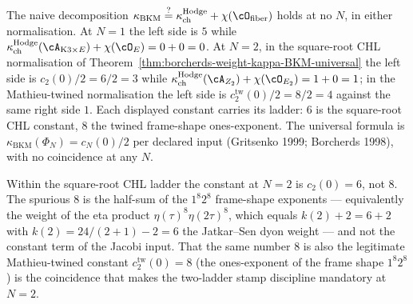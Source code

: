 \begin{remark}
\label{rem:kbkm-additive-failure-per-ladder}
The naive decomposition
$\kappa_{\mathrm{BKM}} \stackrel{?}{=}
\kappa_{\mathrm{ch}}^{\mathrm{Hodge}} + \chi(\cO_{\mathrm{fiber}})$
holds at no $N$, in either normalisation. At $N = 1$ the left side is
$5$ while $\kappa_{\mathrm{ch}}^{\mathrm{Hodge}}(\cA_{\mathrm{K3}\times E}) +
\chi(\cO_E) = 0 + 0 = 0$. At $N = 2$, in the square-root CHL
normalisation of
Theorem~\ref{thm:borcherds-weight-kappa-BKM-universal} the left side
is $c_2(0)/2 = 6/2 = 3$ while
$\kappa_{\mathrm{ch}}^{\mathrm{Hodge}}(\cA_{Z_2}) + \chi(\cO_{E_2}) = 1 + 0
= 1$; in the Mathieu-twined normalisation the left side is
$c_2^{\mathrm{tw}}(0)/2 = 8/2 = 4$ against the same right side $1$.
Each displayed constant carries its ladder: $6$ is the square-root
CHL constant, $8$ the twined frame-shape ones-exponent. The universal
formula is $\kappa_{\mathrm{BKM}}(\Phi_N) = c_N(0)/2$ per declared
input (Gritsenko 1999; Borcherds 1998), with no coincidence at any
$N$.
\end{remark}

\begin{remark}[Error mechanism at \texorpdfstring{$N = 2$}{N = 2}:
eta-product weight versus Jacobi constant term]
\label{rem:kbkm-n2-error-mechanism}
Within the square-root CHL ladder the constant at $N = 2$ is
$c_2(0) = 6$, not $8$. The spurious $8$ is the half-sum of the
$1^8 2^8$ frame-shape exponents --- equivalently the weight of the
eta product $\eta(\tau)^8 \eta(2\tau)^8$, which equals
$k(2) + 2 = 6 + 2$ with $k(2) = 24/(2+1) - 2 = 6$ the Jatkar--Sen
dyon weight --- and not the constant term of the Jacobi input. That
the same number $8$ is also the legitimate Mathieu-twined constant
$c_2^{\mathrm{tw}}(0) = 8$ (the ones-exponent of the frame shape
$1^8 2^8$) is the coincidence that makes the two-ladder stamp
discipline mandatory at $N = 2$.
\end{remark}

